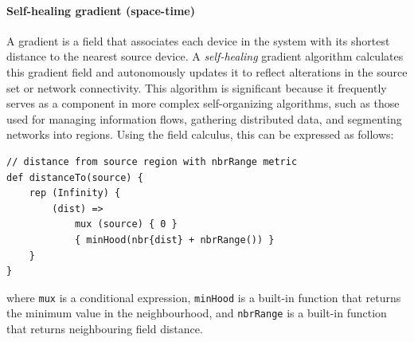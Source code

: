 \paragraph*{Self-healing gradient (space-time)}
A gradient is a field that associates each device in the system with its shortest distance to the nearest source device. 
 A \emph{self-healing} gradient algorithm calculates this gradient field and autonomously 
 updates it to reflect alterations in the source set or network connectivity. 
 This algorithm is significant because it frequently serves as a component in more complex self-organizing algorithms, 
 such as those used for managing information flows, gathering distributed data, and segmenting networks into regions.
 Using the field calculus, this can be expressed as follows:
\begin{lstlisting}[language=scafi]
// distance from source region with nbrRange metric
def distanceTo(source) {
    rep (Infinity) { 
        (dist) =>
            mux (source) { 0 } 
            { minHood(nbr{dist} + nbrRange()) }
    }
}
\end{lstlisting}
where \lstinline|mux| is a conditional expression, 
 \lstinline|minHood| is a built-in function that returns the minimum value in the neighbourhood, 
 and \lstinline|nbrRange| is a built-in function that returns neighbouring field distance.

